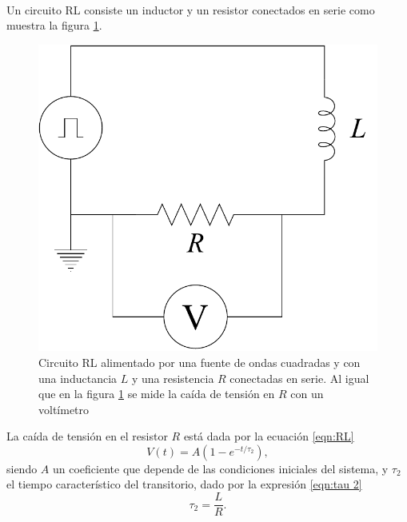 \paragraph{}
Un circuito RL consiste un inductor y un resistor conectados en serie como muestra la figura \ref{esq: RL}.
\begin{figure}[H]
    \centering
    \includegraphics[scale= 0.5]{Esquemas/RL.drawio.pdf}
    \caption{Circuito RL alimentado por una fuente de ondas cuadradas y con una inductancia $L$ y una resistencia $R$ conectadas en serie. Al igual que en la figura \ref{esq: RL} se mide la caída de tensión en $R$ con un voltímetro}
    \label{esq: RL}
\end{figure}
La caída de tensión en el resistor $R$ está dada por la ecuación \eqref{eqn:RL}
\begin{equation}\label{eqn:RL}
    V(t)=A(1-e^{-t/\tau_2}),
\end{equation}
siendo $A$ un coeficiente que depende de las condiciones iniciales del sistema, y $\tau_2$ el tiempo característico del transitorio, dado por la expresión \eqref{eqn:tau 2} 
\begin{equation}\label{eqn:tau 2}
    \tau_2=\frac{L}{R}.
\end{equation}
